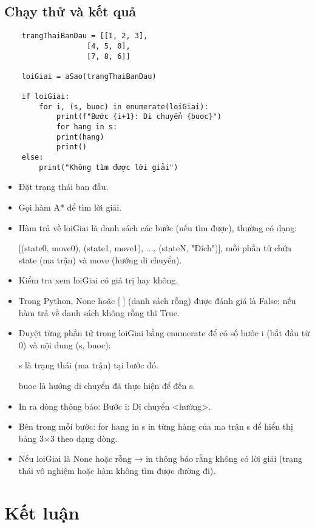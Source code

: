 \documentclass{article}
\begin{document}
\subsection{Chạy thử và kết quả}
\begin{verbatim}
    trangThaiBanDau = [[1, 2, 3],
                   [4, 5, 0],
                   [7, 8, 6]]

    loiGiai = aSao(trangThaiBanDau)

    if loiGiai:
        for i, (s, buoc) in enumerate(loiGiai):
            print(f"Bước {i+1}: Di chuyển {buoc}")
            for hang in s:
            print(hang)
            print()
    else:
        print("Không tìm được lời giải")
\end{verbatim}
\begin{itemize}
    \item Đặt trạng thái ban đầu.
    \item Gọi hàm A* để tìm lời giải.
    \item Hàm trả về loiGiai là danh sách các bước (nếu tìm được), thường có dạng:
    
[(state0, move0), (state1, move1), ..., (stateN, "Đích")], mỗi phần tử chứa state (ma trận) và move (hướng di chuyển).
    \item Kiểm tra xem loiGiai có giá trị hay không.
    \item Trong Python, None hoặc [ ] (danh sách rỗng) được đánh giá là False; nếu hàm trả về danh sách không rỗng thì True.
     \item Duyệt từng phần tử trong loiGiai bằng enumerate để có số bước i (bắt đầu từ 0) và nội dung (s, buoc):
     
     s là trạng thái (ma trận) tại bước đó.
     
     buoc là hướng di chuyển đã thực hiện để đến s.
    \item In ra dòng thông báo:
    Bước i: Di chuyển <hướng>.
    \item Bên trong mỗi bước: for hang in s in từng hàng của ma trận s để hiển thị bảng 3×3 theo dạng dòng.
    \item Nếu loiGiai là None hoặc rỗng → in thông báo rằng không có lời giải (trạng thái vô nghiệm hoặc hàm không tìm được đường đi).

\end{itemize}

\section{Kết luận}
\end{document}

